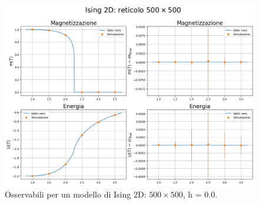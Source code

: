 \vspace*{\fill}

\newpage

\vspace*{\fill}

\begin{figure}[H]
    \centering
    \includegraphics[page=1, width=\textwidth]{Immagini/simIsing2D/obs/obs_500.png}
    \caption{Osservabili per un modello di Ising 2D: $500 \times 500$, h = 0.0.}
\end{figure}

\vspace*{\fill}